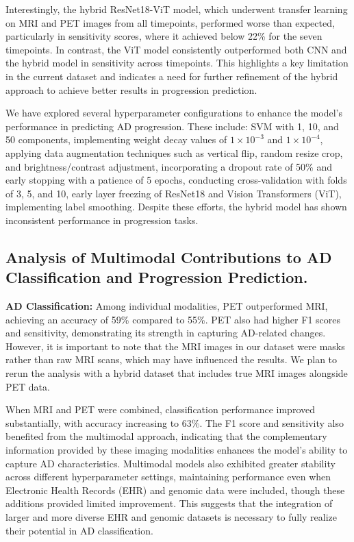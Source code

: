 Interestingly, the hybrid ResNet18-ViT model, which underwent transfer learning on MRI and PET images from all timepoints, performed worse than expected, particularly in sensitivity scores, where it achieved below 22\% for the seven timepoints. In contrast, the ViT model consistently outperformed both CNN and the hybrid model in sensitivity across timepoints. This highlights a key limitation in the current dataset and indicates a need for further refinement of the hybrid approach to achieve better results in progression prediction.

We have explored several hyperparameter configurations to enhance the model's performance in predicting AD progression. These include: SVM with 1, 10, and 50 components, implementing weight decay values of  $1 \times 10^{-3}$ and $1 \times 10^{-4}$, applying data augmentation techniques such as vertical flip, random resize crop, and brightness/contrast adjustment, incorporating a dropout rate of 50\% and early stopping with a patience of 5 epochs, conducting cross-validation with folds of 3, 5, and 10, early layer freezing of ResNet18 and Vision Transformers (ViT), implementing label smoothing. Despite these efforts, the hybrid model has shown inconsistent performance in progression tasks. 

\subsection{Analysis of Multimodal Contributions to AD Classification and Progression Prediction.} 

\textbf{AD Classification:} Among individual modalities, PET outperformed MRI, achieving an accuracy of 59\% compared to 55\%. PET also had higher F1 scores and sensitivity, demonstrating its strength in capturing AD-related changes. However, it is important to note that the MRI images in our dataset were masks rather than raw MRI scans, which may have influenced the results. We plan to rerun the analysis with a hybrid dataset that includes true MRI images alongside PET data.

When MRI and PET were combined, classification performance improved substantially, with accuracy increasing to 63\%. The F1 score and sensitivity also benefited from the multimodal approach, indicating that the complementary information provided by these imaging modalities enhances the model’s ability to capture AD characteristics. Multimodal models also exhibited greater stability across different hyperparameter settings, maintaining performance even when Electronic Health Records (EHR) and genomic data were included, though these additions provided limited improvement. This suggests that the integration of larger and more diverse EHR and genomic datasets is necessary to fully realize their potential in AD classification.

